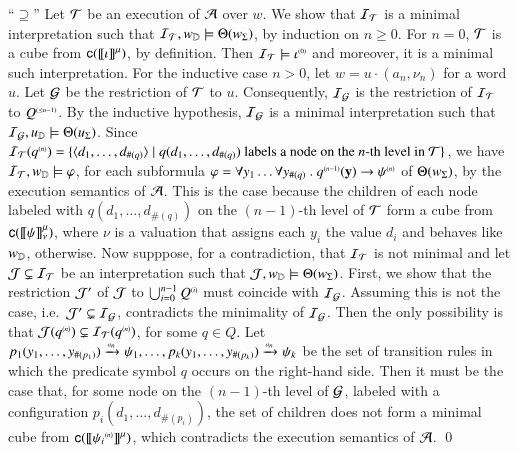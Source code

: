 {  ``$\supseteq$'' Let $\mathcal{T}$ be an execution of $\mathcal{A}$ over $w$. We show
  that $\mathcal{I}_{\mathcal{T}}$ is a minimal interpretation such that $\mathcal{I}_{\mathcal{T}},
  {w}_{\mathbb{D}} \models \Theta({{w}_\Sigma})$, by induction on $n \geq
  0$. For $n=0$, $\mathcal{T}$ is a cube from $\mathsf{c}({{\bf [\![} \iota {\bf ]\!]}^\mu})$, by
  definition. Then $\mathcal{I}_{\mathcal{T}} \models {\iota}^{\scriptscriptstyle{({0})}}$ and moreover, it
  is a minimal such interpretation. For the inductive case $n > 0$,
  let $w=u\cdot(a_n,\nu_n)$ for a word $u$. Let $\mathcal{G}$ be the
  restriction of $\mathcal{T}$ to $u$. Consequently, $\mathcal{I}_{\mathcal{G}}$ is the restriction
  of $\mathcal{I}_{\mathcal{T}}$ to ${Q}^{\scriptscriptstyle{({\leq n-1})}}$. By the inductive hypothesis,
  $\mathcal{I}_{\mathcal{G}}$ is a minimal interpretation such that \(\mathcal{I}_{\mathcal{G}}, u_{\mathbb{D}}
  \models \Theta({u_\Sigma})\). Since $\mathcal{I}_{\mathcal{T}}({q}^{\scriptscriptstyle{({n})}}) =
  \{ \langle d_1,\ldots,d_{\#(q)} \rangle \mid q(d_1,\ldots,d_{\#(q)})
    \text{ labels a node on the $n$-th level in $\mathcal{T}$} \}$, we have $\mathcal{I}_{\mathcal{T}},
  {w}_{\mathbb{D}} \models \varphi$, for each subformula $\varphi = \forall y_1
  \ldots \forall y_{\#(q)} ~.~ {q}^{\scriptscriptstyle{({n-1})}}(\mathbf y)
  \rightarrow {\psi}^{\scriptscriptstyle{({n})}}$ of $\Theta({{w}_\Sigma})$, by the
  execution semantics of $\mathcal{A}$. This is the case because the children
  of each node labeled with $q(d_1,\ldots,d_{\#(q)})$ on the
  $(n-1)$-th level of $\mathcal{T}$ form a cube from
  $\mathsf{c}({{\bf [\![} \psi {\bf ]\!]}^\mu_\nu})$, where $\nu$ is a valuation that assigns
  each $y_i$ the value $d_i$ and behaves like ${w}_{\mathbb{D}}$,
  otherwise. Now supppose, for a contradiction, that $\mathcal{I}_{\mathcal{T}}$ is not
  minimal and let $\mathcal{J} \subsetneq \mathcal{I}_{\mathcal{T}}$ be an interpretation such
  that $\mathcal{J},{w}_{\mathbb{D}} \models \Theta({{w}_\Sigma})$. First, we show that
  the restriction $\mathcal{J}'$ of $\mathcal{J}$ to $\bigcup_{i=0}^{n-1} {Q}^{\scriptscriptstyle{({i})}}$
  must coincide with $\mathcal{I}_{\mathcal{G}}$. Assuming this is not the case,
  i.e.\ $\mathcal{J}' \subsetneq \mathcal{I}_{\mathcal{G}}$, contradicts the minimality of
  $\mathcal{I}_{\mathcal{G}}$. Then the only possibility is that $\mathcal{J}({q}^{\scriptscriptstyle{({n})}})
  \subsetneq \mathcal{I}_{\mathcal{T}}({q}^{\scriptscriptstyle{({n})}})$, for some $q \in Q$. Let
  $p_1(y_1,\ldots,y_{\#(p_1)}) \xrightarrow{{\scriptscriptstyle a_n}}_{{\scriptstyle }} \psi_1, \ldots,
  p_k(y_1,\ldots,y_{\#(p_k)}) \xrightarrow{{\scriptscriptstyle a_n}}_{{\scriptstyle }} \psi_k$ be the set of
  transition rules in which the predicate symbol $q$ occurs on the
  right-hand side. Then it must be the case that, for some node on the
  $(n-1)$-th level of $\mathcal{G}$, labeled with a configuration
  $p_i(d_1,\ldots,d_{\#(p_i)})$, the set of children does not form a
  minimal cube from $\mathsf{c}({{\bf [\![} {\psi_i}^{\scriptscriptstyle{({n})}} {\bf ]\!]}^\mu})$, which
  contradicts the execution semantics of $\mathcal{A}$. \qed}

